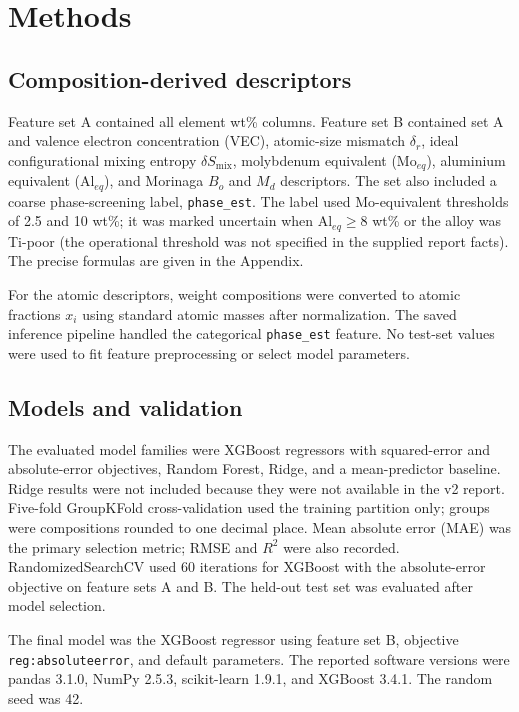 \documentclass[11pt,oneside]{article}
\begin{document}
\section{Methods}
\subsection{Composition-derived descriptors}
Feature set A contained all element wt\% columns. Feature set B contained set A and valence electron concentration (VEC), atomic-size mismatch \(\delta_r\), ideal configurational mixing entropy \(\delta S_{\mathrm{mix}}\), molybdenum equivalent (\(\mathrm{Mo}_{eq}\)), aluminium equivalent (\(\mathrm{Al}_{eq}\)), and Morinaga \(B_o\) and \(M_d\) descriptors. The set also included a coarse phase-screening label, \texttt{phase\_est}. The label used Mo-equivalent thresholds of 2.5 and 10 wt\%; it was marked uncertain when \(\mathrm{Al}_{eq}\geq 8\) wt\% or the alloy was Ti-poor (the operational threshold was not specified in the supplied report facts). The precise formulas are given in the Appendix.

For the atomic descriptors, weight compositions were converted to atomic fractions \(x_i\) using standard atomic masses after normalization. The saved inference pipeline handled the categorical \texttt{phase\_est} feature. No test-set values were used to fit feature preprocessing or select model parameters.

\subsection{Models and validation}
The evaluated model families were XGBoost regressors with squared-error and absolute-error objectives, Random Forest, Ridge, and a mean-predictor baseline. Ridge results were not included because they were not available in the v2 report. Five-fold GroupKFold cross-validation used the training partition only; groups were compositions rounded to one decimal place. Mean absolute error (MAE) was the primary selection metric; RMSE and \(R^2\) were also recorded. RandomizedSearchCV used 60 iterations for XGBoost with the absolute-error objective on feature sets A and B. The held-out test set was evaluated after model selection.

The final model was the XGBoost regressor using feature set B, objective \texttt{reg:absoluteerror}, and default parameters. The reported software versions were pandas 3.1.0, NumPy 2.5.3, scikit-learn 1.9.1, and XGBoost 3.4.1. The random seed was 42.
\end{document}

